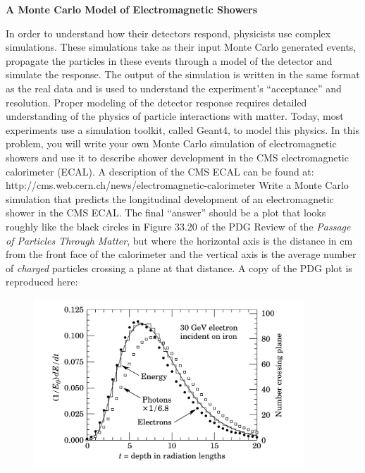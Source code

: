 \documentclass[12pt]{article}
\begin{document}
\begin{center}
{\large\bf A Monte Carlo Model of Electromagnetic Showers
}
\end{center}
\vspace{0.2cm}
In order to understand how their detectors respond, physicists
use complex simulations.  These simulations take as their input Monte Carlo
generated events, propagate the particles in these events through a model
of the detector and simulate the response.  The output of the simulation
is written in the same format as the real data and is used
to understand the experiment's ``acceptance'' and resolution.
Proper modeling of the detector response requires detailed understanding
of the physics of particle interactions with matter.  Today, most
experiments use a simulation toolkit, called Geant4, to model this physics.
In this problem, you will write your own Monte Carlo simulation of
electromagnetic showers and use it to describe shower development in the
CMS electromagnetic calorimeter (ECAL).  A description 
of the CMS ECAL can be found at:
http://cms.web.cern.ch/news/electromagnetic-calorimeter
\noindent
Write a Monte Carlo simulation that
predicts the longitudinal development of an electromagnetic shower in
the CMS ECAL.  The final ``answer'' should be a plot that looks 
roughly like the black circles in Figure 33.20 of the PDG Review of 
the {\it Passage of Particles
Through Matter}, but where the horizontal axis is the distance in cm
from the front face of the calorimeter and the vertical axis is
the average number of {\it charged} particles crossing a plane at 
that distance.
A copy of the PDG plot is reproduced here:
\begin{figure}[h]
  \begin{center}
\includegraphics[width=4.0in]{e30fe.png}
  \end{center}
\end{figure}
\end{document}
